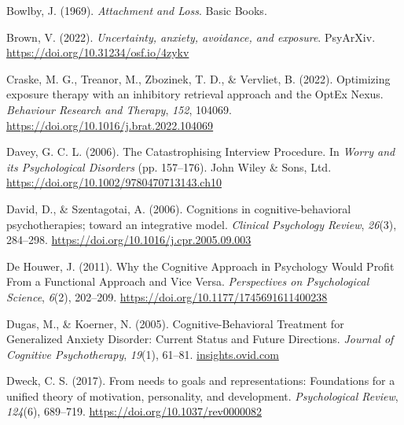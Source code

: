 \documentclass[
  man,floatsintext]{apa7}
\newlength{\cslhangindent}
\newlength{\cslentryspacingunit} %
\newenvironment{CSLReferences}[2] %
 {%
  \setlength{\parindent}{0pt}
  \ifodd #1
  \let\oldpar\par
  \def\par{\hangindent=\cslhangindent\oldpar}
  \fi
  \setlength{\parskip}{#2\cslentryspacingunit}
 }%
 {}
\begin{document}
\begin{CSLReferences}{1}{0}
\leavevmode{}%
Bowlby, J. (1969). \emph{Attachment and Loss}. Basic Books.

\leavevmode{}%
Brown, V. (2022). \emph{Uncertainty, anxiety, avoidance, and exposure}. PsyArXiv. \url{https://doi.org/10.31234/osf.io/4zykv}

\leavevmode{}%
Craske, M. G., Treanor, M., Zbozinek, T. D., \& Vervliet, B. (2022). Optimizing exposure therapy with an inhibitory retrieval approach and the OptEx Nexus. \emph{Behaviour Research and Therapy}, \emph{152}, 104069. \url{https://doi.org/10.1016/j.brat.2022.104069}

\leavevmode{}%
Davey, G. C. L. (2006). The Catastrophising Interview Procedure. In \emph{Worry and its Psychological Disorders} (pp. 157--176). John Wiley \& Sons, Ltd. \url{https://doi.org/10.1002/9780470713143.ch10}

\leavevmode{}%
David, D., \& Szentagotai, A. (2006). Cognitions in cognitive-behavioral psychotherapies; toward an integrative model. \emph{Clinical Psychology Review}, \emph{26}(3), 284--298. \url{https://doi.org/10.1016/j.cpr.2005.09.003}

\leavevmode{}%
De Houwer, J. (2011). Why the Cognitive Approach in Psychology Would Profit From a Functional Approach and Vice Versa. \emph{Perspectives on Psychological Science}, \emph{6}(2), 202--209. \url{https://doi.org/10.1177/1745691611400238}

\leavevmode{}%
Dugas, M., \& Koerner, N. (2005). Cognitive-Behavioral Treatment for Generalized Anxiety Disorder: Current Status and Future Directions. \emph{Journal of Cognitive Psychotherapy}, \emph{19}(1), 61--81. \href{https://insights.ovid.com}{insights.ovid.com}

\leavevmode{}%
Dweck, C. S. (2017). From needs to goals and representations: Foundations for a unified theory of motivation, personality, and development. \emph{Psychological Review}, \emph{124}(6), 689--719. \url{https://doi.org/10.1037/rev0000082}


\end{CSLReferences}
\end{document}
